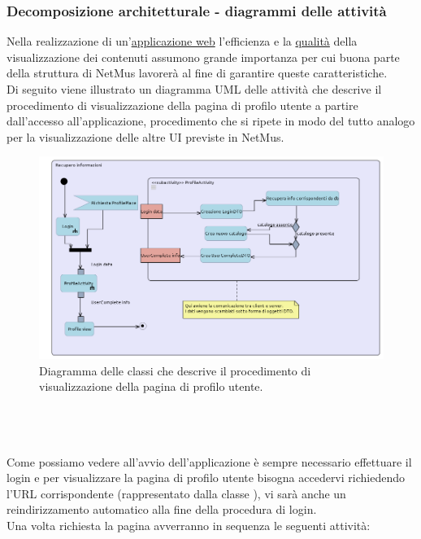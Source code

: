 \subsubsection{Decomposizione architetturale - diagrammi delle attivit\`a}
Nella realizzazione di un'\underline{applicazione web} l'efficienza e la
\underline{qualit\`a} della visualizzazione dei contenuti assumono grande
importanza per cui buona parte della struttura di NetMus lavorer\`a al fine di garantire queste
caratteristiche. \\
Di seguito viene illustrato un diagramma UML delle attivit\`a che descrive il
procedimento di visualizzazione della pagina di profilo utente a partire
dall'accesso all'applicazione, procedimento che si ripete in modo del tutto
analogo per la visualizzazione delle altre UI previste in NetMus.
\begin{figure}[h]
  \centering
  \includegraphics[width=16.5cm]{img/ST/profile.png}
\caption{Diagramma delle classi che descrive il procedimento di
visualizzazione della pagina di profilo utente.}
\end{figure}
\\\\\\Come possiamo vedere all'avvio dell'applicazione \`e sempre necessario
effettuare il login e per visualizzare la pagina di profilo utente bisogna accedervi
richiedendo l'URL corrispondente (rappresentato dalla classe ),
vi sar\`a anche un reindirizzamento automatico alla fine della procedura di
login.\\ 
Una volta richiesta la pagina avverranno in sequenza le seguenti attivit\`a:

